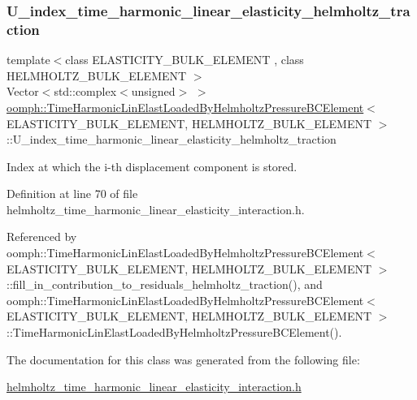 \subsubsection{\texorpdfstring{U\+\_\+index\+\_\+time\+\_\+harmonic\+\_\+linear\+\_\+elasticity\+\_\+helmholtz\+\_\+traction}{U\_index\_time\_harmonic\_linear\_elasticity\_helmholtz\_traction}}
{\footnotesize\ttfamily template$<$class E\+L\+A\+S\+T\+I\+C\+I\+T\+Y\+\_\+\+B\+U\+L\+K\+\_\+\+E\+L\+E\+M\+E\+NT , class H\+E\+L\+M\+H\+O\+L\+T\+Z\+\_\+\+B\+U\+L\+K\+\_\+\+E\+L\+E\+M\+E\+NT $>$ \\
Vector$<$std\+::complex$<$unsigned$>$ $>$ \hyperlink{classoomph_1_1TimeHarmonicLinElastLoadedByHelmholtzPressureBCElement}{oomph\+::\+Time\+Harmonic\+Lin\+Elast\+Loaded\+By\+Helmholtz\+Pressure\+B\+C\+Element}$<$ E\+L\+A\+S\+T\+I\+C\+I\+T\+Y\+\_\+\+B\+U\+L\+K\+\_\+\+E\+L\+E\+M\+E\+NT, H\+E\+L\+M\+H\+O\+L\+T\+Z\+\_\+\+B\+U\+L\+K\+\_\+\+E\+L\+E\+M\+E\+NT $>$\+::U\+\_\+index\+\_\+time\+\_\+harmonic\+\_\+linear\+\_\+elasticity\+\_\+helmholtz\+\_\+traction\hspace{0.3cm}{\ttfamily [protected]}}



Index at which the i-\/th displacement component is stored. 



Definition at line 70 of file helmholtz\+\_\+time\+\_\+harmonic\+\_\+linear\+\_\+elasticity\+\_\+interaction.\+h.



Referenced by oomph\+::\+Time\+Harmonic\+Lin\+Elast\+Loaded\+By\+Helmholtz\+Pressure\+B\+C\+Element$<$ E\+L\+A\+S\+T\+I\+C\+I\+T\+Y\+\_\+\+B\+U\+L\+K\+\_\+\+E\+L\+E\+M\+E\+N\+T, H\+E\+L\+M\+H\+O\+L\+T\+Z\+\_\+\+B\+U\+L\+K\+\_\+\+E\+L\+E\+M\+E\+N\+T $>$\+::fill\+\_\+in\+\_\+contribution\+\_\+to\+\_\+residuals\+\_\+helmholtz\+\_\+traction(), and oomph\+::\+Time\+Harmonic\+Lin\+Elast\+Loaded\+By\+Helmholtz\+Pressure\+B\+C\+Element$<$ E\+L\+A\+S\+T\+I\+C\+I\+T\+Y\+\_\+\+B\+U\+L\+K\+\_\+\+E\+L\+E\+M\+E\+N\+T, H\+E\+L\+M\+H\+O\+L\+T\+Z\+\_\+\+B\+U\+L\+K\+\_\+\+E\+L\+E\+M\+E\+N\+T $>$\+::\+Time\+Harmonic\+Lin\+Elast\+Loaded\+By\+Helmholtz\+Pressure\+B\+C\+Element().



The documentation for this class was generated from the following file\+:\begin{DoxyCompactItemize}
\item 
\hyperlink{helmholtz__time__harmonic__linear__elasticity__interaction_8h}{helmholtz\+\_\+time\+\_\+harmonic\+\_\+linear\+\_\+elasticity\+\_\+interaction.\+h}\end{DoxyCompactItemize}
